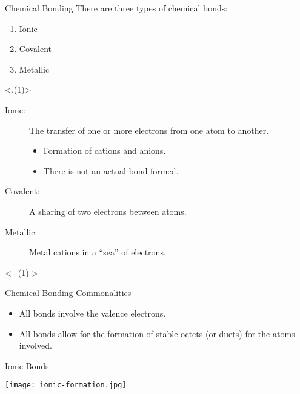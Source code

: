\documentclass[handout]{beamer}
\begin{document}
\begin{frame}[t]{Chemical Bonding}
	There are three types of chemical bonds:
	\begin{enumerate}[<+(1)->]
		\item Ionic
		\item Covalent
		\item Metallic
	\end{enumerate}

	\note<.(1)>{%
		\begin{description}
			\item[Ionic:] The \alert{transfer} of one or more
				electrons from one atom to another.
				\begin{itemize}[<1->]
					\item Formation of cations and anions.
					\item There is not an actual bond formed.
				\end{itemize}
			\item[Covalent:] A \alert{sharing} of two electrons between
				atoms.
			\item[Metallic:] Metal cations in a ``sea'' of
				electrons.
		\end{description}
	}

	\bigskip

	\onslide<+(1)->

	\begin{block}{Chemical Bonding Commonalities}
		\begin{itemize}
			\item All bonds involve the valence electrons.
			\item All bonds allow for the formation of stable
				octets (or duets) for the atoms involved.
		\end{itemize}
	\end{block}
\end{frame}

\begin{frame}{Ionic Bonds}
	\begin{center}
		\texttt{[image: ionic-formation.jpg]}
	\end{center}

\end{frame}
\end{document}
